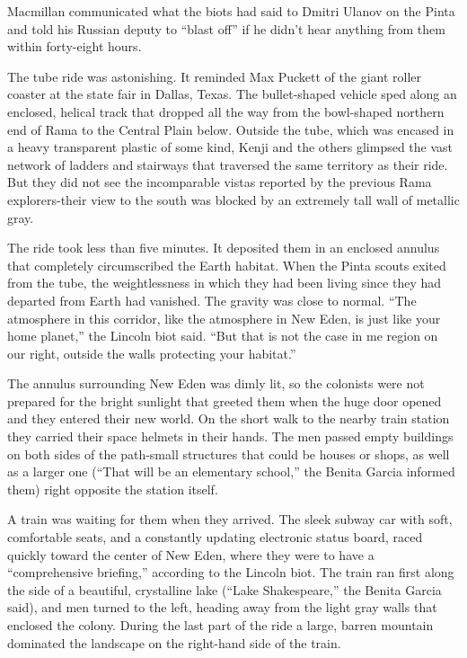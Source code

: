 \documentclass[]{article}
\begin{document}
{Macmillan communicated what the biots had said to Dmitri Ulanov on the Pinta and told his Russian deputy to “blast off” if he didn’t hear anything from them within forty-eight hours.

The tube ride was astonishing.  It reminded Max Puckett of the giant roller coaster at the state fair in Dallas, Texas.  The bullet-shaped vehicle sped along an enclosed, helical track that dropped all the way from the bowl-shaped northern end of Rama to the Central Plain below.  Outside the tube, which was encased in a heavy transparent plastic of some kind, Kenji and the others glimpsed the vast network of ladders and stairways that traversed the same territory as their ride.  But they did not see the incomparable vistas reported by the previous Rama explorers-their view to the south was blocked by an extremely tall wall of metallic gray.

The ride took less than five minutes.  It deposited them in an enclosed annulus that completely circumscribed the Earth habitat.  When the Pinta scouts exited from the tube, the weightlessness in which they had been living since they had departed from Earth had vanished.  The gravity was close to normal.  “The atmosphere in this corridor, like the atmosphere in New Eden, is just like your home planet,” the Lincoln biot said.  “But that is not the case in me region on our right, outside the walls protecting your habitat.”

The annulus surrounding New Eden was dimly lit, so the colonists were not prepared for the bright sunlight that greeted them when the huge door opened and they entered their new world.  On the short walk to the nearby train station they carried their space helmets in their hands.  The men passed empty buildings on both sides of the path-small structures that could be houses or shops, as well as a larger one (“That will be an elementary school,” the Benita Garcia informed them) right opposite the station itself.

A train was waiting for them when they arrived.  The sleek subway car with soft, comfortable seats, and a constantly updating electronic status board, raced quickly toward the center of New Eden, where they were to have a “comprehensive briefing,” according to the Lincoln biot.  The train ran first along the side of a beautiful, crystalline lake (“Lake Shakespeare,” the Benita Garcia said), and men turned to the left, heading away from the light gray walls that enclosed the colony.  During the last part of the ride a large, barren mountain dominated the landscape on the right-hand side of the train.

}
\end{document}
